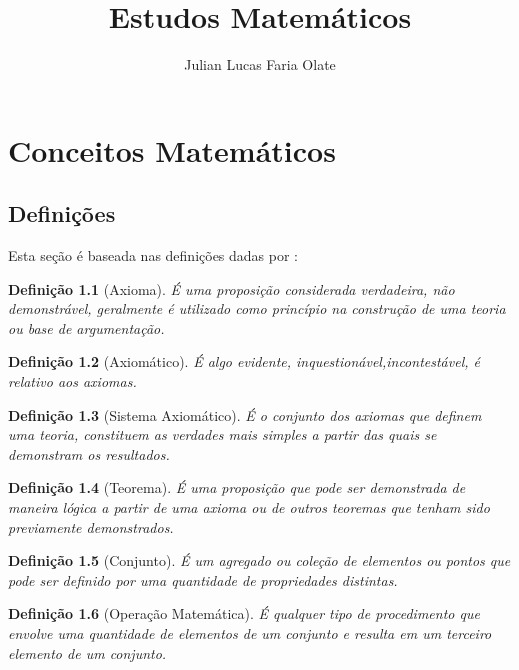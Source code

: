 \documentclass[
    12pt, %
    a4paper, %
]{book}
\title{Estudos Matemáticos}
\author{Julian Lucas Faria Olate}
\newtheorem{defi}{Definição}[section]
\begin{document}
    \maketitle
    \tableofcontents

    \chapter{Conceitos Matemáticos}\label{ch:conceitos-matemáticos}
        \section{Definições}\label{sec:definicoes}
            Esta seção é baseada nas definições dadas por \cite{dos-santos2014}:

            \begin{defi}[Axioma]\label{defi:axioma}
                É uma proposição considerada verdadeira, não demonstrável, geralmente é utilizado como princípio na construção de uma teoria ou base de argumentação.
            \end{defi}

            \begin{defi}[Axiomático]\label{defi:axiomatico}
                É algo evidente, inquestionável,\newline incontestável, é relativo aos axiomas.
            \end{defi}

            \begin{defi}[Sistema Axiomático]\label{defi:sistema-axiomatico}
                É o conjunto dos axiomas que definem uma teoria, constituem as verdades mais simples a partir das quais se demonstram os resultados.
            \end{defi}

            \begin{defi}[Teorema]\label{defi:teorema}
                É uma proposição que pode ser demonstrada de maneira lógica a partir de uma axioma ou de outros teoremas que tenham sido previamente demonstrados.
            \end{defi}

            \begin{defi}[Conjunto]\label{defi:conjunto}
                É um agregado ou coleção de elementos ou pontos que pode ser definido por uma quantidade de propriedades distintas.
            \end{defi}

            \begin{defi}[Operação Matemática]\label{defi:operacao-matematica}
                É qualquer tipo de procedimento que envolve uma quantidade de elementos de um conjunto e resulta em um terceiro elemento de um conjunto.
            \end{defi}
\end{document}

